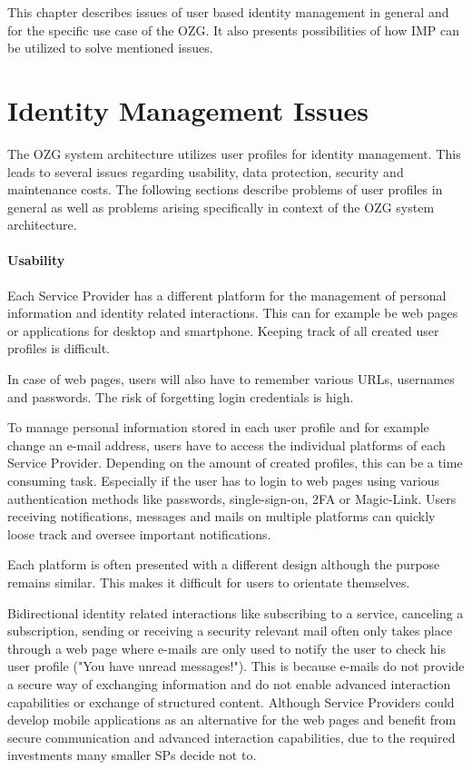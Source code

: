 This chapter describes issues of user based identity management in general and for the specific use case of the OZG. It also presents possibilities of how IMP can be utilized to solve mentioned issues.

\section{Identity Management Issues} \label{section:identity_management_issues}

The OZG system architecture utilizes user profiles for identity management. This leads to several issues regarding usability, data protection, security and maintenance costs. The following sections describe problems of user profiles in general as well as problems arising specifically in context of the OZG system architecture.

\paragraph{Usability}
Each Service Provider has a different platform for the management of personal information and identity related interactions. This can for example be web pages or applications for desktop and smartphone. Keeping track of all created user profiles is difficult.

In case of web pages, users will also have to remember various URLs, usernames and passwords. The risk of forgetting login credentials is high.

To manage personal information stored in each user profile and for example change an e-mail address, users have to access the individual platforms of each Service Provider. Depending on the amount of created profiles, this can be a time consuming task. Especially if the user has to login to web pages using various authentication methods like passwords, single-sign-on, 2FA or Magic-Link. Users receiving notifications, messages and mails on multiple platforms can quickly loose track and oversee important notifications.

Each platform is often presented with a different design although the purpose remains similar. This makes it difficult for users to orientate themselves.

Bidirectional identity related interactions like subscribing to a service, canceling a subscription, sending or receiving a security relevant mail often only takes place through a web page where e-mails are only used to notify the user to check his user profile ("You have unread messages!"). This is because e-mails do not provide a secure way of exchanging information and do not enable advanced interaction capabilities or exchange of structured content. Although Service Providers could develop mobile applications as an alternative for the web pages and benefit from secure communication and advanced interaction capabilities, due to the required investments many smaller SPs decide not to.


